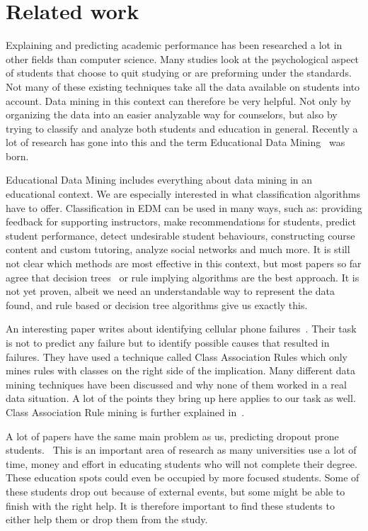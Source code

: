 \section{Related work}
Explaining and predicting academic performance has been researched a lot in other fields than computer science. Many studies look at the psychological aspect of students that choose to quit studying or are preforming under the standards. Not many of these existing techniques take all the data available on students into account. Data mining in this context can therefore be very helpful. Not only by organizing the data into an easier analyzable way for counselors, but also by trying to classify and analyze both students and education in general. Recently a lot of research has gone into this and the term Educational Data Mining~\cite{1} was born.

\bigskip\noindent
Educational Data Mining includes everything about data mining in an educational context.
We are especially interested in what classification algorithms have to offer. 
Classification in EDM can be used in many ways, such as:
providing feedback for supporting instructors,
make recommendations for students,
predict student performance,
detect undesirable student behaviours,
constructing course content and custom tutoring,
analyze social networks and much more.
It is still not clear which methods are most effective in this context, but most papers so far agree that decision trees~\cite{2,12} or rule implying algorithms are the best approach.
It is not yet proven, albeit we need an understandable way to represent the data found, and rule based or decision tree algorithms give us exactly this. 

\bigskip\noindent
An interesting paper writes about identifying cellular phone failures~\cite{3}.
Their task is not to predict any failure but to identify possible causes that resulted in failures.  
They have used a technique called Class Association Rules which only mines rules with classes on the right side of the implication. 
Many different data mining techniques have been discussed and why none of them worked in a real data situation. 
A lot of the points they bring up here applies to our task as well.
Class Association Rule mining is further explained in~\cite{4}.

\bigskip\noindent
A lot of papers have the same main problem as us, predicting dropout prone students.~\cite{5,7,8,9,11} 
This is an important area of research as many universities use a lot of time, 
money and effort in educating students who will not complete their degree. 
These education spots could even be occupied by more focused students. 
Some of these students drop out because of external events, but some might be able to finish with the right help. 
It is therefore important to find these students to either help them or drop them from the study. 

